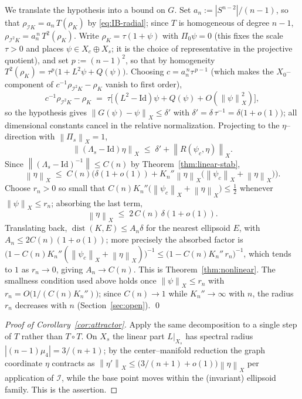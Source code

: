 \documentclass[11pt,reqno]{amsart}
\theoremstyle{plain}
\theoremstyle{definition}
\newcommand{\IB}{\mathcal{I}}
\newcommand{\norm}[1]{\left\lVert #1 \right\rVert}
\newcommand{\abs}[1]{\left\lvert #1 \right\rvert}
\DeclareMathOperator{\dist}{dist}
\begin{document}
We translate the hypothesis into a bound on $G$. Set
$a_n:=\abs{S^{n-2}}/(n-1)$, so that $\rho_{\IB K}=a_n\,T(\rho_K)$ by
\eqref{eq:IB-radial}; since $T$ is homogeneous of degree $n-1$,
$\rho_{\IB^2K}=a_n^{\,n}\,T^2(\rho_K)$. Write $\rho_K=\tau(1+\psi)$ with
$\Pi_0\psi=0$ (this fixes the scale $\tau>0$ and places
$\psi\in X_c\oplus X_s$; it is the choice of representative in the projective
quotient), and set $p:=(n-1)^2$, so that by homogeneity
$T^2(\rho_K)=\tau^{p}\big(1+L^2\psi+Q(\psi)\big)$. Choosing
$c=a_n^{\,n}\tau^{\,p-1}$ (which makes the $X_0$--component of
$c^{-1}\rho_{\IB^2K}-\rho_K$ vanish to first order),
\[
   c^{-1}\rho_{\IB^2 K}-\rho_K
   \;=\;\tau\Big[(L^2-\mathrm{Id})\psi+Q(\psi)+O(\norm\psi^2_X)\Big],
\]
so the hypothesis gives $\norm{G(\psi)-\psi}_X\le\delta'$ with
$\delta'=\delta\,\tau^{-1}=\delta\big(1+o(1)\big)$; all dimensional constants
cancel in the relative normalization. Projecting to the $\eta$--direction
with $\norm{\Pi_s}_X=1$,
\[
   \norm{(\Lambda_s-\mathrm{Id})\eta}_X
   \;\le\;\delta'+\norm{R(\psi_c,\eta)}_X .
\]
Since $\norm{(\Lambda_s-\mathrm{Id})^{-1}}\le C(n)$ by
Theorem~\ref{thm:linear-stab},
\[
   \norm\eta_X\;\le\;C(n)\Big(\delta(1+o(1))
   +K_n''\norm\eta_X\big(\norm{\psi_c}_X+\norm\eta_X\big)\Big).
\]
Choose $r_n>0$ so small that $C(n)K_n''\big(\norm{\psi_c}_X+\norm\eta_X\big)
\le\tfrac12$ whenever $\norm\psi_X\le r_n$; absorbing the last term,
\[
   \norm\eta_X\;\le\;2\,C(n)\,\delta(1+o(1)).
\]
Translating back, $\dist(K,E)\le A_n\delta$ for the nearest ellipsoid $E$,
with $A_n\le 2C(n)(1+o(1))$; more precisely the absorbed factor is
$\big(1-C(n)K_n''(\norm{\psi_c}_X+\norm\eta_X)\big)^{-1}\le
\big(1-C(n)K_n''\,r_n\big)^{-1}$, which tends to $1$ as $r_n\to0$, giving
$A_n\to C(n)$. This is Theorem~\ref{thm:nonlinear}. The smallness
condition used above holds once $\norm\psi_X\le r_n$ with
$r_n=O\big(1/(C(n)K_n'')\big)$; since $C(n)\to1$ while
$K_n''\to\infty$ with $n$, the radius $r_n$ decreases with $n$
(Section~\ref{sec:open}).
\qed

\begin{proof}[Proof of Corollary~\ref{cor:attractor}]
Apply the same decomposition to a single step of $T$ rather than $T\circ T$.
On $X_s$ the linear part $L|_{X_s}$ has spectral radius $\abs{(n-1)\mu_4}
=3/(n+1)$; by the center--manifold reduction the graph coordinate $\eta$
contracts as $\norm{\eta'}_X\le\big(3/(n+1)+o(1)\big)\norm\eta_X$ per
application of $\IB$, while the base point moves within the (invariant)
ellipsoid family. This is the assertion.
\end{proof}
\end{document}
